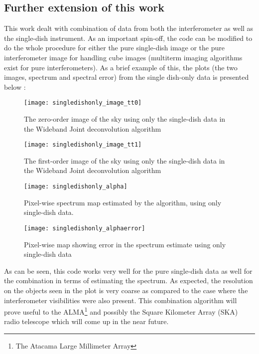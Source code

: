 \documentclass{article}
\begin{document}
\subsection{Further extension of this work}
This work dealt with combination of data from both the interferometer as well as the single-dish instrument. As an important spin-off, the code can be modified to do the whole procedure for either the pure single-dish image or the pure interferometer image for handling cube images (multiterm imaging algorithms exist for pure interferometers). As a brief example of this, the plots (the two images, spectrum and spectral error) from the single dish-only data is presented below : 
\\
\begin{figure}[H]
\centering
\texttt{[image: singledishonly\_image\_tt0]}
\caption{The zero-order image of the sky using only the single-dish data in the Wideband Joint deconvolution algorithm}
\label{fig:singledishonly_image_tt0}
\end{figure}
\begin{figure}[H]
\centering
\texttt{[image: singledishonly\_image\_tt1]}
\caption{The first-order image of the sky using only the single-dish data in the Wideband Joint deconvolution algorithm}
\label{fig:singledishonly_image_tt1}
\end{figure}
\begin{figure}[H]
\centering
\texttt{[image: singledishonly\_alpha]}
\caption{Pixel-wise spectrum map estimated by the algorithm, using only single-dish data.}
\label{fig:singledishonly_alpha}
\end{figure}
\begin{figure}[H]
\centering
\texttt{[image: singledishonly\_alphaerror]}
\caption{Pixel-wise map showing error in the spectrum estimate using only single-dish data}
\label{fig:SD_alpha_error}
\end{figure}
As can be seen, this code works very well for the pure single-dish data as well for the combination in terms of estimating the spectrum. As expected, the resolution on the objects seen in the plot is very coarse as compared to the case where the interferometer visibilities were also present. This combination algorithm will prove useful to the ALMA\footnote{The Atacama Large Millimeter Array} and possibly the Square Kilometer Array (SKA) radio telescope which will come up in the near future.
\end{document}
